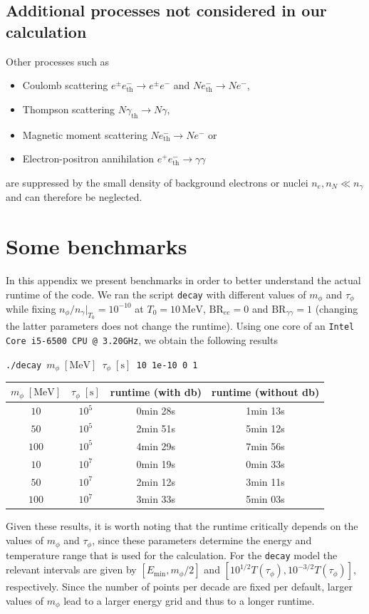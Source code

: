 \documentclass[11pt,a4paper]{article}
\newcommand{\eq}[1]{#1}
\begin{document}
\subsection*{Additional processes not considered in our calculation}
Other processes such as
\begin{itemize}
	\item Coulomb scattering $e^\pm e^-_\text{th} \rightarrow e^\pm e^-$ and $N e^-_\text{th} \rightarrow N e^-$,
	\item Thompson scattering $N \gamma_\text{th} \rightarrow N \gamma$,
	\item Magnetic moment scattering $N e^-_\text{th} \rightarrow N e^-$ or
	\item Electron-positron annihilation $e^+ e^-_\text{th} \rightarrow \gamma \gamma$
\end{itemize}
are suppressed by the small density of background electrons or nuclei  $\eq{n}_{e}, n_N \ll \eq{n}_{\gamma}$ and can therefore be neglected.


\section{Some benchmarks}
\label{sec:benchmarks_single}

In this appendix we present benchmarks in order to better understand the actual runtime of the code. We ran the script \texttt{decay} with different values of $m_\phi$ and $\tau_\phi$ while fixing $n_\phi/n_\gamma|_{T_0} = 10^{-10}$ at $T_0=10\,\mathrm{MeV}$, $\text{BR}_{ee} = 0$ and $\text{BR}_{\gamma\gamma}=1$ (changing the latter parameters does not change the runtime). Using one core of an \texttt{Intel Core i5-6500 CPU @ 3.20GHz}, we obtain the following results
\begin{center}
	\texttt{./decay $m_\phi\;\mathrm{[MeV]}$  $\tau_\phi\;\mathrm{[s]}$ 10 1e-10 0 1}
	\begin{tabular}{|c|c|c|c|}
		\hline
		$m_\phi\;\mathrm{[MeV]}$ & $\tau_\phi\;\mathrm{[s]}$ &  runtime (with db) & runtime (without db) \\
		\hline\hline
		$10$ & $10^5$ & 0min 28s & 1min 13s\\
		\hline
		$50$ & $10^5$ & 2min 51s & 5min 12s \\
		\hline
		$100$ & $10^5$ & 4min 29s & 7min 56s \\
		\hline\hline
		$10$ & $10^7$ & 0min 19s & 0min 33s\\
		\hline
		$50$ & $10^7$ & 2min 12s & 3min 11s\\
		\hline
		$100$ & $10^7$ & 3min 33s & 5min 03s\\
		\hline
	\end{tabular}
\end{center}
Given these results, it is worth noting that the runtime critically depends on the values of $m_\phi$ and $\tau_\phi$, since these parameters determine the energy and temperature range that is used for the calculation. For the \texttt{decay} model the relevant intervals are given by $[E_\text{min}, m_\phi/2]$ and $[10^{1/2}T(\tau_\phi), 10^{-3/2}T(\tau_\phi)]$, respectively. Since the number of points per decade are fixed per default, larger values of $m_\phi$ lead to a larger energy grid and thus to a longer runtime.
\end{document}
